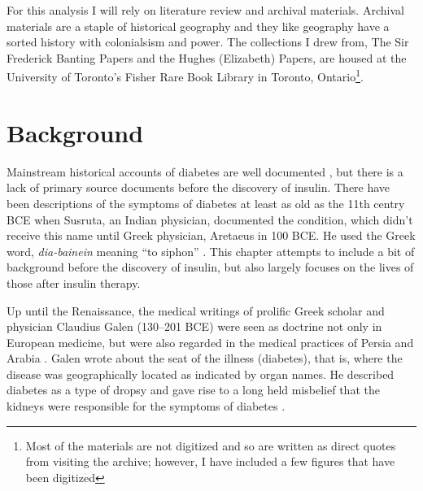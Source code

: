 \documentclass[12pt]{article}
\begin{document}
For this analysis I will rely on literature review and archival materials. Archival materials are a staple of historical geography and they like geography have a sorted history with colonialsism and power. The collections I drew from, The Sir Frederick Banting Papers and the Hughes (Elizabeth) Papers, are housed at the University of Toronto's Fisher Rare Book Library in Toronto, Ontario\footnote{Most of the materials are not digitized and so are written as direct quotes from visiting the archive; however, I have included a few figures that have been digitized}. 
\section{Background}
\doublespacing
Mainstream historical accounts of diabetes are well documented \citep{engelhardt_diabetes_1989, tattersall_diabetes_2009}, but there is a lack of primary source documents before the discovery of insulin. There have been descriptions of the symptoms of diabetes at least as old as the 11th centry BCE when Susruta, an Indian physician, documented the condition, which didn't receive this name until Greek physician, Aretaeus in 100 BCE. He used the Greek word, \textit {dia-bainein} meaning ``to siphon'' \citep{sattley_history_1996}. This chapter attempts to include a bit of background before the discovery of insulin, but also largely focuses on the lives of those after insulin therapy. 

Up until the Renaissance, the medical writings of prolific Greek scholar and physician Claudius Galen (130--201 BCE) were seen as doctrine not only in European medicine, but were also regarded in the medical practices of Persia and Arabia \citep{henschen_1969_term}. Galen wrote about the seat of the illness (diabetes), that is, where the disease was geographically located as indicated by organ names. He described diabetes as a type of dropsy and gave rise to a long held misbelief that the kidneys were responsible for the symptoms of diabetes \citep{henschen_1969_term}. 
\end{document}
